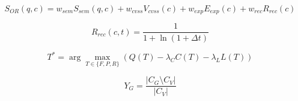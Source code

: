 
\begin{equation}
S_{OR}(q, c) = w_{sem} S_{sem}(q, c) + w_{cvss} V_{cvss}(c) + w_{exp} E_{exp}(c) + w_{rec} R_{rec}(c)
\label{eq:mfsr}
\end{equation}

\begin{equation}
R_{rec}(c, t) = \frac{1}{1 + \ln(1 + \Delta t)}
\label{eq:recency}
\end{equation}

\begin{equation}
T^* = \arg \max_{T \in \{F, P, R\}} (Q(T) - \lambda_C C(T) - \lambda_L L(T))
\label{eq:routing}
\end{equation}

\begin{equation}
Y_G = \frac{|C_G \setminus C_V|}{|C_V|}
\label{eq:yield}
\end{equation}
